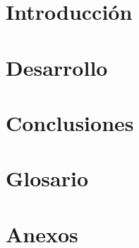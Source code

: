 \documentclass[12pt,letterpaper]{article}
\begin{document}



\tableofcontents
\newpage

\section{Introducción}

\newpage

\section{Desarrollo}

\newpage

\section{Conclusiones}

\newpage

\section{Glosario}

\newpage

\section{Anexos}

\newpage


\end{document}
